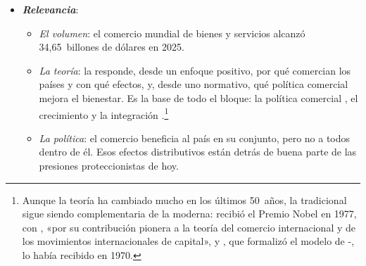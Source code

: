 \documentclass[11pt]{article}
\begin{document}
\begin{itemize}
\item \textbf{\emph{Relevancia}}:
  \begin{itemize}
  \item \emph{El volumen}: el comercio mundial de bienes y servicios alcanzó 34,65~billones de dólares en 2025\nocite{OMC2026Perspectivas}.
  \item \emph{La teoría}: la  responde, desde un enfoque positivo, por qué comercian los países y con qué efectos, y, desde uno normativo, qué política comercial mejora el bienestar. Es la base de todo el bloque: la política comercial  , el crecimiento  y la integración .\footnote{Aunque la teoría ha cambiado mucho en los últimos 50~años, la tradicional sigue siendo complementaria de la moderna:  recibió el Premio Nobel en 1977, con , «por su contribución pionera a la teoría del comercio internacional y de los movimientos internacionales de capital»\nocite{Nobel1977MeadeOhlin}, y , que formalizó el modelo de -, lo había recibido en 1970\nocite{Nobel1970Samuelson}.\label{fn:nobel}}
  \item \emph{La política}: el comercio beneficia al país en su conjunto, pero no a todos dentro de él. Esos efectos distributivos están detrás de buena parte de las presiones proteccionistas de hoy.
  \end{itemize}


\end{itemize}
\end{document}

